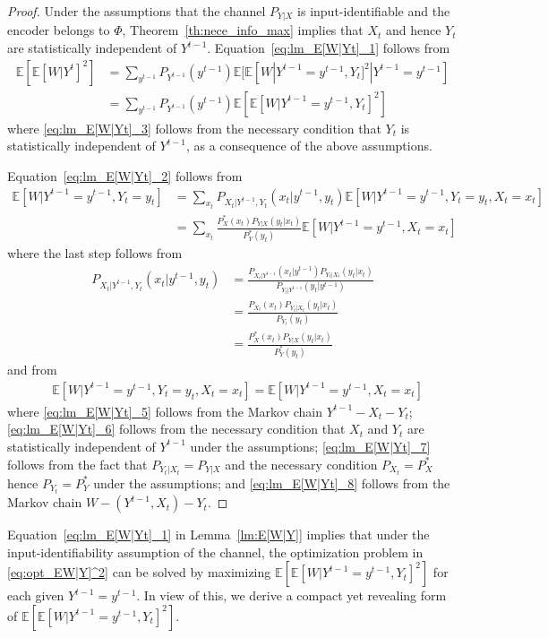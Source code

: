 \documentclass{article}
\newcommand{\E}{\mathbb{E}}
\begin{document}
\begin{proof}
Under the assumptions that the channel $P_{Y|X}$ is input-identifiable and the encoder belongs to $\mathsf\Phi$, Theorem~\ref{th:nece_info_max} implies that $X_t$ and hence $Y_t$ are statistically independent of $Y^{t-1}$.
Equation~\eqref{eq:lm_E[W|Yt]_1} follows from
\begin{align}
\E[\E[W|Y^{t}]^2]  
&= \sum_{y^{t-1}}P_{Y^{t-1}}(y^{t-1}) \E[\E[W|Y^{t-1}=y^{t-1}, Y_t]^2|Y^{t-1}=y^{t-1}] \nonumber\\
&= \sum_{y^{t-1}}P_{Y^{t-1}}(y^{t-1}) \E[\E[W|Y^{t-1}=y^{t-1}, Y_t]^2] \label{eq:lm_E[W|Yt]_3}
\end{align}
where \eqref{eq:lm_E[W|Yt]_3} follows from the necessary condition that $Y_t$ is statistically independent of $Y^{t-1}$, as a consequence of the above assumptions.

Equation~\eqref{eq:lm_E[W|Yt]_2} follows from
\begin{align}
\E[W|Y^{t-1}=y^{t-1}, Y_t=y_t]  
&= \sum_{x_t} P_{X_t|Y^{t-1}, Y_t}(x_t|y^{t-1}, y_t)
\E[W|Y^{t-1}=y^{t-1}, Y_t=y_t, X_t=x_t] \\
&= \sum_{x_t}\frac{P_{X}^*(x_t) P_{Y|X}(y_t|x_t)}{P_{Y}^*(y_t)} \E[W|Y^{t-1}=y^{t-1}, X_t=x_t] 
\end{align}
where the last step follows from
\begin{align}
P_{X_t|Y^{t-1}, Y_t}(x_t|y^{t-1}, y_t) 
&= \frac{P_{X_t|Y^{t-1}}(x_t|y^{t-1})P_{Y_t|X_t}(y_t|x_t)}{P_{Y_t|Y^{t-1}}(y_t|y^{t-1})}  \label{eq:lm_E[W|Yt]_5}\\
&= \frac{P_{X_t}(x_t) P_{Y_t|X_t}(y_t|x_t) }{P_{Y_t}(y_t)}  \label{eq:lm_E[W|Yt]_6} \\
&= \frac{P_{X}^*(x_t) P_{Y|X}(y_t|x_t)}{P_{Y}^*(y_t)}  \label{eq:lm_E[W|Yt]_7}
\end{align}
and from
\begin{align}
&\E[W|Y^{t-1}=y^{t-1}, Y_t=y_t, X_t=x_t] = 
\E[W|Y^{t-1}=y^{t-1}, X_t=x_t]  \label{eq:lm_E[W|Yt]_8}
\end{align}
where \eqref{eq:lm_E[W|Yt]_5} follows from the Markov chain $Y^{t-1}-X_t-Y_t$; 
\eqref{eq:lm_E[W|Yt]_6} follows from the necessary condition that $X_t$ and $Y_t$ are statistically independent of $Y^{t-1}$ under the assumptions;
\eqref{eq:lm_E[W|Yt]_7} follows from the fact that $P_{Y_t|X_t}=P_{Y|X}$ and the necessary condition $P_{X_t}=P_X^*$ hence $P_{Y_t}=P_Y^*$ under the assumptions; 
and 
\eqref{eq:lm_E[W|Yt]_8} follows from the Markov chain $W - (Y^{t-1},X_t) - Y_t$.
\end{proof}
Equation~\eqref{eq:lm_E[W|Yt]_1} in Lemma~\ref{lm:E[W|Y]} implies that under the input-identifiability assumption of the channel, the optimization problem in \eqref{eq:opt_EW|Y]^2} can be solved by maximizing $\E[\E[W|Y^{t-1}=y^{t-1}, Y_t]^2]$ for each given $Y^{t-1}=y^{t-1}$. In view of this, we derive a compact yet revealing form of $\E[\E[W|Y^{t-1}=y^{t-1}, Y_t]^2]$.
\end{document}
